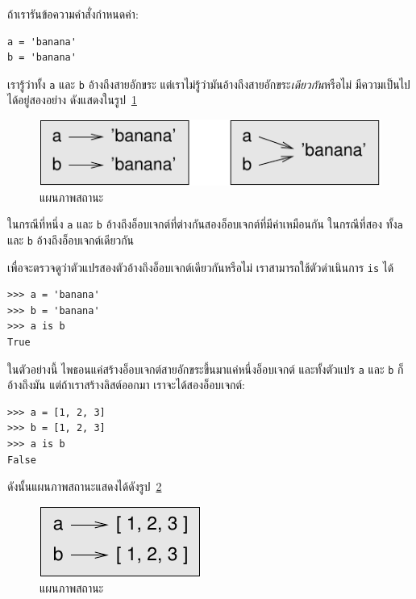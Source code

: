 ถ้าเรารันข้อความคำสั่งกำหนดค่า:

\begin{verbatim}
a = 'banana'
b = 'banana'
\end{verbatim}
%
เรารู้ว่าทั้ง \texttt{a} และ \texttt{b} อ้างถึงสายอักขระ
แต่เราไม่รู้ว่ามันอ้างถึงสายอักขระ\emph{เดียวกัน}หรือไม่
มีความเป็นไปได้อยู่สองอย่าง ดังแสดงในรูป~\ref{fig.list1}

\begin{figure}
\centerline
{\includegraphics[scale=0.8]{figs/list1.pdf}}
\caption{แผนภาพสถานะ}
\label{fig.list1}
\end{figure}

ในกรณีที่หนึ่ง \texttt{a} และ \texttt{b} อ้างถึงอ็อบเจกต์ที่ต่างกันสองอ็อบเจกต์ที่มีค่าเหมือนกัน
ในกรณีที่สอง ทั้ง\texttt{a} และ \texttt{b} อ้างถึงอ็อบเจกต์เดียวกัน

เพื่อจะตรวจดูว่าตัวแปรสองตัวอ้างถึงอ็อบเจกต์เดียวกันหรือไม่
เราสามารถใช้ตัวดำเนินการ \texttt{is} ได้

\begin{verbatim}
>>> a = 'banana'
>>> b = 'banana'
>>> a is b
True
\end{verbatim}
%
ในตัวอย่างนี้ ไพธอนแค่สร้างอ็อบเจกต์สายอักขระขึ้นมาแค่หนึ่งอ็อบเจกต์
และทั้งตัวแปร \texttt{a} และ \texttt{b} ก็อ้างถึงมัน
แต่ถ้าเราสร้างลิสต์ออกมา เราจะได้สองอ็อบเจกต์:

\begin{verbatim}
>>> a = [1, 2, 3]
>>> b = [1, 2, 3]
>>> a is b
False
\end{verbatim}
%
ดังนั้นแผนภาพสถานะแสดงได้ดังรูป~\ref{fig.list2}

\begin{figure}
\centerline
{\includegraphics[scale=0.8]{figs/list2.pdf}}
\caption{แผนภาพสถานะ}
\label{fig.list2}
\end{figure}

